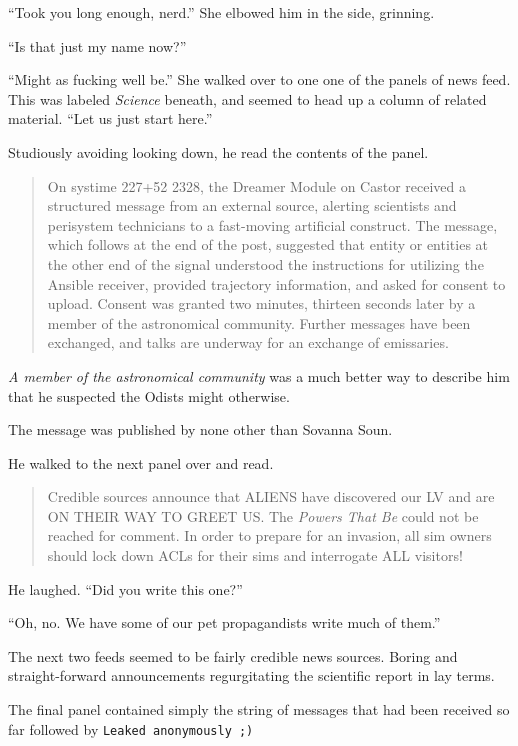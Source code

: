 ``Took you long enough, nerd.'' She elbowed him in the side, grinning.

``Is that just my name now?''

``Might as fucking well be.'' She walked over to one one of the panels of news feed. This was labeled \emph{Science} beneath, and seemed to head up a column of related material. ``Let us just start here.''

Studiously avoiding looking down, he read the contents of the panel.

\begin{quote}
On systime 227+52 2328, the Dreamer Module on Castor received a structured message from an external source, alerting scientists and perisystem technicians to a fast-moving artificial construct. The message, which follows at the end of the post, suggested that entity or entities at the other end of the signal understood the instructions for utilizing the Ansible receiver, provided trajectory information, and asked for consent to upload. Consent was granted two minutes, thirteen seconds later by a member of the astronomical community. Further messages have been exchanged, and talks are underway for an exchange of emissaries.
\end{quote}

\emph{A member of the astronomical community} was a much better way to describe him that he suspected the Odists might otherwise.

The message was published by none other than Sovanna Soun.

He walked to the next panel over and read.

\begin{quote}
Credible sources announce that ALIENS have discovered our LV and are ON THEIR WAY TO GREET US. The \emph{Powers That Be} could not be reached for comment. In order to prepare for an invasion, all sim owners should lock down ACLs for their sims and interrogate ALL visitors!
\end{quote}

He laughed. ``Did you write this one?''

``Oh, no. We have some of our pet propagandists write much of them.''

The next two feeds seemed to be fairly credible news sources. Boring and straight-forward announcements regurgitating the scientific report in lay terms.

The final panel contained simply the string of messages that had been received so far followed by \texttt{Leaked\ anonymously\ ;)}

